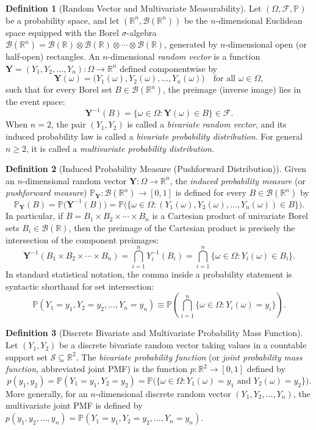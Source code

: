 \documentclass[11pt, letterpaper]{article}
\theoremstyle{definition}
\newtheorem{definition}{Definition}[section]
\theoremstyle{remark}
\newcommand{\R}{\mathbb{R}}
\newcommand{\Prob}{\mathbb{P}}
\newcommand{\F}{\mathcal{F}}
\begin{document}
\begin{definition}[Random Vector and Multivariate Measurability]
Let $(\Omega, \F, \Prob)$ be a probability space, and let $(\R^n, \mathcal{B}(\R^n))$ be the $n$-dimensional Euclidean space equipped with the Borel $\sigma$-algebra $\mathcal{B}(\R^n) = \mathcal{B}(\R) \otimes \mathcal{B}(\R) \otimes \cdots \otimes \mathcal{B}(\R)$, generated by $n$-dimensional open (or half-open) rectangles. An $n$-dimensional \emph{random vector} is a function $\mathbf{Y} = (Y_1, Y_2, \dots, Y_n) : \Omega \to \R^n$ defined componentwise by
\[
\mathbf{Y}(\omega) = \bigl(Y_1(\omega), Y_2(\omega), \dots, Y_n(\omega)\bigr) \quad \text{for all } \omega \in \Omega,
\]
such that for every Borel set $B \in \mathcal{B}(\R^n)$, the preimage (inverse image) lies in the event space:
\[
\mathbf{Y}^{-1}(B) = \{\omega \in \Omega : \mathbf{Y}(\omega) \in B\} \in \F.
\]
When $n = 2$, the pair $(Y_1, Y_2)$ is called a \emph{bivariate random vector}, and its induced probability law is called a \emph{bivariate probability distribution}. For general $n \ge 2$, it is called a \emph{multivariate probability distribution}.
\end{definition}

\begin{definition}[Induced Probability Measure (Pushforward Distribution)]
Given an $n$-dimensional random vector $\mathbf{Y} : \Omega \to \R^n$, the \emph{induced probability measure} (or \emph{pushforward measure}) $\Prob_{\mathbf{Y}} : \mathcal{B}(\R^n) \to [0, 1]$ is defined for every $B \in \mathcal{B}(\R^n)$ by
\[
\Prob_{\mathbf{Y}}(B) = \Prob\bigl(\mathbf{Y}^{-1}(B)\bigr) = \Prob\bigl(\{\omega \in \Omega : (Y_1(\omega), Y_2(\omega), \dots, Y_n(\omega)) \in B\}\bigr).
\]
In particular, if $B = B_1 \times B_2 \times \cdots \times B_n$ is a Cartesian product of univariate Borel sets $B_i \in \mathcal{B}(\R)$, then the preimage of the Cartesian product is precisely the intersection of the component preimages:
\[
\mathbf{Y}^{-1}(B_1 \times B_2 \times \cdots \times B_n) = \bigcap_{i=1}^{n} Y_i^{-1}(B_i) = \bigcap_{i=1}^{n} \{\omega \in \Omega : Y_i(\omega) \in B_i\}.
\]
In standard statistical notation, the comma inside a probability statement is syntactic shorthand for set intersection:
\[
\Prob(Y_1 = y_1, Y_2 = y_2, \dots, Y_n = y_n) \equiv \Prob\left(\bigcap_{i=1}^{n} \{\omega \in \Omega : Y_i(\omega) = y_i\}\right).
\]
\end{definition}

\begin{definition}[Discrete Bivariate and Multivariate Probability Mass Function]
Let $(Y_1, Y_2)$ be a discrete bivariate random vector taking values in a countable support set $\mathcal{S} \subseteq \R^2$. The \emph{bivariate probability function} (or \emph{joint probability mass function}, abbreviated joint PMF) is the function $p : \R^2 \to [0, 1]$ defined by
\[
p(y_1, y_2) = \Prob(Y_1 = y_1, Y_2 = y_2) = \Prob\bigl(\{\omega \in \Omega : Y_1(\omega) = y_1 \text{ and } Y_2(\omega) = y_2\}\bigr).
\]
More generally, for an $n$-dimensional discrete random vector $(Y_1, Y_2, \dots, Y_n)$, the multivariate joint PMF is defined by $p(y_1, y_2, \dots, y_n) = \Prob(Y_1 = y_1, Y_2 = y_2, \dots, Y_n = y_n)$.
\end{definition}
\end{document}
